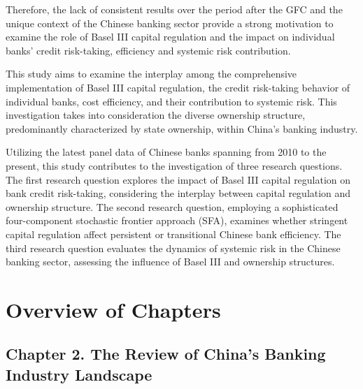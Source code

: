 \documentclass[
  12pt,
  a4paper,
]{scrreprt}
\begin{document}
Therefore, the lack of consistent results over the period after the GFC
and the unique context of the Chinese banking sector provide a strong
motivation to examine the role of Basel III capital regulation and the
impact on individual banks' credit risk-taking, efficiency and systemic
risk contribution.

This study aims to examine the interplay among the comprehensive
implementation of Basel III capital regulation, the credit risk-taking
behavior of individual banks, cost efficiency, and their contribution to
systemic risk. This investigation takes into consideration the diverse
ownership structure, predominantly characterized by state ownership,
within China's banking industry.

Utilizing the latest panel data of Chinese banks spanning from 2010 to
the present, this study contributes to the investigation of three
research questions. The first research question explores the impact of
Basel III capital regulation on bank credit risk-taking, considering the
interplay between capital regulation and ownership structure. The second
research question, employing a sophisticated four-component stochastic
frontier approach (SFA), examines whether stringent capital regulation
affect persistent or transitional Chinese bank efficiency. The third
research question evaluates the dynamics of systemic risk in the Chinese
banking sector, assessing the influence of Basel III and ownership
structures.

\section{Overview of Chapters}\label{overview-of-chapters}

\subsection{Chapter 2. The Review of China's Banking Industry
Landscape}\label{chapter-2.-the-review-of-chinas-banking-industry-landscape}
\end{document}

